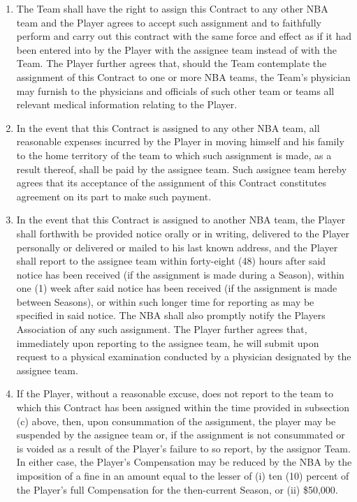 \documentclass[
]{book}
\providecommand{\tightlist}{%
  \setlength{\itemsep}{0pt}\setlength{\parskip}{0pt}}
\begin{document}
\begin{enumerate}
\def\labelenumi{(\alph{enumi})}
\tightlist
\item
  The Team shall have the right to assign this Contract to any other NBA team and the Player agrees to accept such assignment and to faithfully perform and carry out this contract with the same force and effect as if it had been entered into by the Player with the assignee team instead of with the Team. The Player further agrees that, should the Team contemplate the assignment of this Contract to one or more NBA teams, the Team's physician may furnish to the physicians and officials of such other team or teams all relevant medical information relating to the Player.
\item
  In the event that this Contract is assigned to any other NBA team, all reasonable expenses incurred by the Player in moving himself and his family to the home territory of the team to which such assignment is made, as a result thereof, shall be paid by the assignee team. Such assignee team hereby agrees that its acceptance of the assignment of this Contract constitutes agreement on its part to make such payment.
\item
  In the event that this Contract is assigned to another NBA team, the Player shall forthwith be provided notice orally or in writing, delivered to the Player personally or delivered or mailed to his last known address, and the Player shall report to the assignee team within forty-eight (48) hours after said notice has been received (if the assignment is made during a Season), within one (1) week after said notice has been received (if the assignment is made between Seasons), or within such longer time for reporting as may be specified in said notice. The NBA shall also promptly notify the Players Association of any such assignment. The Player further agrees that, immediately upon reporting to the assignee team, he will submit upon request to a physical examination conducted by a physician designated by the assignee team.
\item
  If the Player, without a reasonable excuse, does not report to the team to which this Contract has been assigned within the time provided in subsection (c) above, then, upon consummation of the assignment, the player may be suspended by the assignee team or, if the assignment is not consummated or is voided as a result of the Player's failure to so report, by the assignor Team. In either case, the Player's Compensation may be reduced by the NBA by the imposition of a fine in an amount equal to the lesser of (i) ten (10) percent of the Player's full Compensation for the then-current Season, or (ii) \$50,000.
\end{enumerate}
\end{document}
